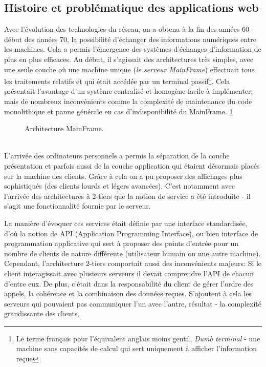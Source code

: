 \subsection{Histoire et problématique des applications web}
Avec l'évolution des technologies du réseau, on a obtenu à la fin des années 60 - début des années 70,  la possibilité d'échanger des informations numériques entre les machines. Cela a permis l'émergence des systèmes d'échanges d'information de plus en plus efficaces. Au début, il s'agissait des architectures très simples, avec une seule couche où une machine unique (\emph{le serveur MainFrame}) effectuait tous les traitements relatifs et qui était accédée par un terminal passif\footnote{Le terme français pour l'équivalent anglais moins gentil, \emph{Dumb terminal} - une machine sans capacités de calcul qui sert uniquement à afficher l'information reçue}. Cela présentait l'avantage d'un système centralisé et homogène facile à implémenter, mais de nombreux inconvénients comme la complexité de maintenance du code monolithique et panne générale en cas d'indisponibilité du MainFrame. \ref{fig:mainframe} 
\begin{figure}[h!]
	\centering
\caption{Architecture MainFrame.}
\label{fig:mainframe}
\end{figure}
\\
L'arrivée des ordinateurs personnels a permis la séparation de la couche présentation et parfois aussi  de la couche application qui étaient désormais placés sur la machine des clients. Grâce à cela on a pu proposer des affichages plus sophistiqués (des clients lourds et légers avancées). C'est notamment avec l'arrivée des architectures à 2-tiers que la notion de service a été introduite - il s'agit une fonctionnalité fournie par le serveur.


La manière d'évoquer ces services était définie par une interface standardisée, d'où la notion de API (Application Programming Interface), ou bien interface de programmation applicative qui sert à proposer des points d'entrée pour un nombre de clients de nature différente (utilisateur humain ou une autre machine).
\\ 
Cependant, l'architecture 2-tiers comportait aussi des inconvénients majeurs:
Si le client interagissait avec plusieurs serveurs il devait comprendre l'API de chacun d'entre eux. De plus, c'était dans la responsabilité du client de gérer l'ordre des appels, la cohérence et la combinaison des données reçues. S'ajoutent à cela les serveurs qui pouvaient pas communiquer l'un avec l'autre, résultat - la complexité grandissante des clients. 


